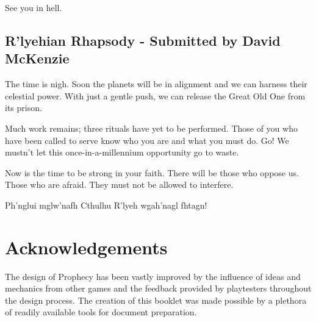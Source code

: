 \documentclass[12pt, a5paper, parskip=half-, footheight=1.4cm]{scrartcl}
\begin{document}
See you in hell.

\subsection*{R'lyehian Rhapsody \setmainfont{URWClassico} - Submitted by David McKenzie} \label{subsection:rlyehian-rhapsody}
The time is nigh.
Soon the planets will be in alignment and we can harness their celestial power.
With just a gentle push, we can release the Great Old One from its prison.

Much work remains; three rituals have yet to be performed.
Those of you who have been called to serve know who you are and what you must do.  Go! We mustn't let this once-in-a-millennium opportunity go to waste.

Now is the time to be strong in your faith.
There will be those who oppose us.
Those who are afraid.
They must not be allowed to interfere.

Ph'nglui mglw'nafh Cthulhu R'lyeh wgah'nagl fhtagn!

\newpage

\thispagestyle{plain}
\enlargethispage{3.5\baselineskip} %

\section*{Acknowledgements} \label{section:acknowledgements}
The design of Prophecy has been vastly improved by the influence of ideas and mechanics from other games and the feedback provided by playtesters throughout the design process.  
The creation of this booklet was made possible by a plethora of readily available tools for document preparation.
\end{document}

